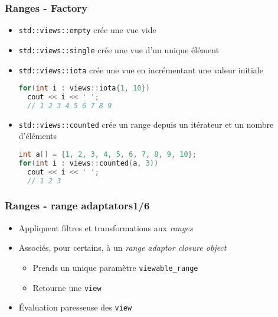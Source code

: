 \documentclass[C++.tex]{subfiles}
\begin{document}
\begin{frame}[fragile]
	\frametitle{Ranges - Factory}
	\begin{itemize}
		\item \lstinline|std::views::empty| crée une vue vide
		\item \lstinline|std::views::single| crée une vue d'un unique élément
		\item \lstinline|std::views::iota| crée une vue en incrémentant une valeur initiale
	
		\begin{lstlisting}[language=C++]
for(int i : views::iota{1, 10})
  cout << i << ' ';
  // 1 2 3 4 5 6 7 8 9\end{lstlisting}
	
		\item \lstinline|std::views::counted| crée un range depuis un itérateur et un nombre d'éléments
	
		\begin{lstlisting}[language=C++]
int a[] = {1, 2, 3, 4, 5, 6, 7, 8, 9, 10};
for(int i : views::counted(a, 3))
  cout << i << ' ';
  // 1 2 3\end{lstlisting}
	\end{itemize}
\end{frame}

\begin{frame}[fragile]
	\frametitle{Ranges - range adaptators\titlehfill{}1/6}
	\begin{itemize}
		\item Appliquent filtres et transformations aux \textit{ranges}
		\item Associés, pour certains, à un \textit{range adaptor closure object}
		\begin{itemize}
			\item Prends un unique paramètre \lstinline|viewable_range|
			\item Retourne une \lstinline|view|
		\end{itemize}
		\item Évaluation paresseuse des \lstinline|view|
	\end{itemize}
\end{frame}
\end{document}
